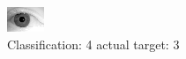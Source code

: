 \begin{figure}[h!]
\begin{center}
\includegraphics[width=0.60\columnwidth]{figures/ID2063_class_4_target_3.png}
\end{center}
\caption{ Classification: 4 actual target: 3}
\label{fig:ID2063_class_4_target_3}
\end{figure}

